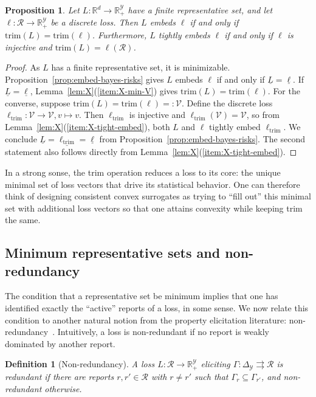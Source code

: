\documentclass[11pt]{article}
\newcommand{\reals}{\mathbb{R}}
\newcommand{\simplex}{\Delta_\Y}
\newcommand{\R}{\mathcal{R}}
\newcommand{\V}{\mathcal{V}}
\newcommand{\Y}{\mathcal{Y}}
\newcommand{\risk}[1]{\underline{#1}}
\newcommand{\toto}{\rightrightarrows}
\newcommand{\trim}{\mathrm{trim}}
\newcommand{\trimcover}{\mathrm{trim}}
\newtheorem{proposition}{Proposition}
\newtheorem{definition}{Definition}
\begin{document}
\begin{proposition}\label{prop:embed-iff-trims-equal}
  Let $L:\reals^d\to\reals^\Y_+$ have a finite representative set, and let $\ell:\R\to\reals^\Y_+$ be a discrete loss.
  Then $L$ embeds $\ell$ if and only if $\trimcover(L) = \trimcover(\ell)$.
  Furthermore, $L$ tightly embeds $\ell$ if and only if $\ell$ is injective and $\trimcover(L) = \ell(\R)$.
\end{proposition}
\begin{proof}
  As $L$ has a finite representative set, it is minimizable.
  Proposition~\ref{prop:embed-bayes-risks} gives $L$ embeds $\ell$ if and only if $\risk L = \risk \ell$.
  If $\risk L = \risk \ell$, Lemma~\ref{lem:X}(\ref{item:X-min-V}) gives $\trim(L) = \trim(\ell)$.
  For the converse, suppose $\trim(L) = \trim(\ell) =: \V$.
  Define the discrete loss $\ell_\trim : \V \to \V, v\mapsto v$.
  Then $\ell_\trim$ is injective and $\ell_\trim(\V) = \V$, so from Lemma~\ref{lem:X}(\ref{item:X-tight-embed}), both $L$ and $\ell$ tightly embed $\ell_\trim$.
  We conclude $\risk L = \risk{\ell_\trim} = \risk \ell$ from Proposition~\ref{prop:embed-bayes-risks}.
  The second statement also follows directly from Lemma~\ref{lem:X}(\ref{item:X-tight-embed}).
\end{proof}

In a strong sonse, the trim operation reduces a loss to its core: the unique minimal set of loss vectors that drive its statistical behavior.
One can therefore think of designing consistent convex surrogates as trying to ``fill out'' this minimal set with additional loss vectors so that one attains convexity while keeping trim the same.

\subsection{Minimum representative sets and non-redundancy}

The condition that a representative set be minimum implies that one has identified exactly the ``active'' reports of a loss, in some sense.
We now relate this condition to another natural notion from the property elicitation literature: non-redundancy~\cite{frongillo2014general,lambert2018elicitation}.
Intuitively, a loss is non-redundant if no report is weakly dominated by another report.

\begin{definition}[Non-redundancy]\label{def:nonredundant}
  A loss $L : \R \to \reals^\Y_+$ eliciting $\Gamma:\simplex \toto \R$ is \emph{redundant} if there are reports $r, r' \in \R$ with $r \neq r'$ such that $\Gamma_r \subseteq \Gamma_{r'}$, and \emph{non-redundant} otherwise.
\end{definition}
\end{document}
